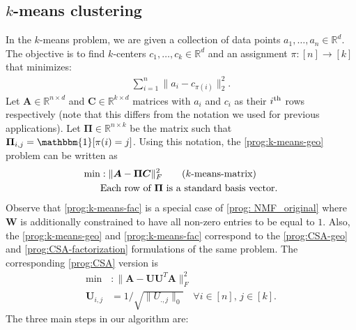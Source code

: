 \documentclass[11pt]{article}
\newcommand{\sumL}{\sum\limits}
\theoremstyle{plain}
\theoremstyle{plain}
\theoremstyle{definition}
\theoremstyle{plain}
\theoremstyle{remark}
\newcommand{\RR}{\mathbb{R}}
\begin{document}
\subsection{$k$-means clustering \cite{cohen2015dimensionality}}\label{sec:k-means}
In the $k$-means problem, we are given a collection of data points $a_1,\dots,a_n \in \RR^d$. The objective is to find $k$-centers $c_1,\dots,c_k \in \RR^d$ and an assignment $\pi: [n]\rightarrow [k]$ that minimizes:
\begin{align}
\label{prog:k-means-geo}    \sumL_{i=1}^n \|a_i-c_{\pi(i)}\|_2^2 \tag{$k$-means}.
\end{align}
Let $\bm{A}\in \RR^{n\times d}$ and  $\bm{C} \in \RR^{k\times d}$ matrices with $a_i$ and $c_i$ as their $i^{\textnormal{th}}$ rows respectively (note that this differs from the notation we used for previous applications). Let $\bm{\Pi}\in \RR^{n\times k}$ be the matrix such that $\bm{\Pi}_{i,j}=\mathbbm{1}[\pi(i)=j]$. Using this notation, the \ref{prog:k-means-geo} problem can be written as 
\begin{align}
    \label{prog:k-means-fac} \min&: \|\bm{A}- \bm{\Pi}\bm{C}\|_F^2 \tag{$k$-means-matrix}\\
    &\textnormal{Each row of } \bm{\Pi} \textnormal{ is a standard basis vector}. \nonumber
\end{align}
 Observe that \ref{prog:k-means-fac} is a special case of \ref{prog: NMF_original} where $\bm{W}$ is additionally constrained to have all non-zero entries to be equal to $1$. Also, the \ref{prog:k-means-geo} and \ref{prog:k-means-fac} correspond to the \ref{prog:CSA-geo} and \ref{prog:CSA-factorization} formulations of the same problem. The corresponding \ref{prog:CSA} version is 
\begin{align*}
 \label{prog:k-means-csa} \min&: \|\bm{A}-\bm{U}\bm{U}^T\bm{A}\|_F^2 \tag{$k$-means-CSA}\\
 \bm{U}_{i,j}&=1/\sqrt{\|U_{.,j}\|_0} \quad \forall i\in [n],\, j\in [k].  
\end{align*}
The three main steps in our algorithm are:
\end{document}
